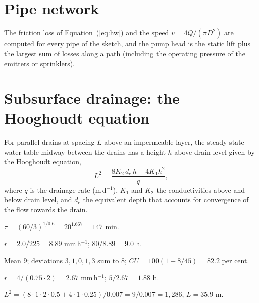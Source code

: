 \section{Pipe network}
The friction loss of Equation~(\ref{eq:hw}) and the speed $v=4Q/(\pi D^2)$ are computed for every pipe of the sketch, and the pump head is the static lift plus the largest sum of losses along a path (including the operating pressure of the emitters or sprinklers).

\section{Subsurface drainage: the Hooghoudt equation}
For parallel drains at spacing $L$ above an impermeable layer, the steady-state water table midway between the drains has a height $h$ above drain level given by the Hooghoudt equation,
\begin{equation}\label{eq:hooghoudt}\boxed{L^{2}=\frac{8K_2\,d_e\,h+4K_1h^{2}}{q},}\end{equation}
where $q$ is the drainage rate (m\,d$^{-1}$), $K_1$ and $K_2$ the conductivities above and below drain level, and $d_e$ the equivalent depth that accounts for convergence of the flow towards the drain.



\sol  $\tau=(60/3)^{1/0.6}=20^{1.667}=147$ min.

\sol  $r=2.0/225=8.89$ mm\,h$^{-1}$; $80/8.89=9.0$ h.

\sol  Mean $9$; deviations $3,1,0,1,3$ sum to $8$; $CU=100(1-8/45)=82.2$ per cent.

\sol  $r=4/(0.75\cdot2)=2.67$ mm\,h$^{-1}$; $5/2.67=1.88$ h.

\sol  $L^2=(8\cdot1\cdot2\cdot0.5+4\cdot1\cdot0.25)/0.007=9/0.007=1{,}286$, $L=35.9$ m.


